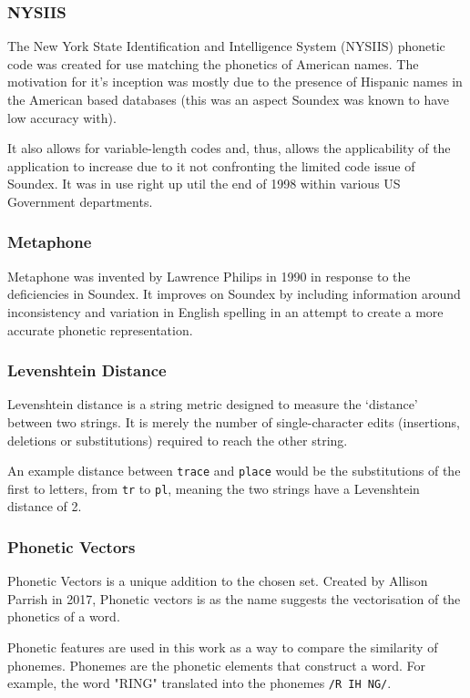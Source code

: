 \subsubsection*{NYSIIS}
\label{sec:nysiis}
The New York State Identification and Intelligence System (NYSIIS) phonetic code was created for use matching the phonetics of American names. The motivation for it's inception was mostly due to the presence of Hispanic names in the American based databases (this was an aspect Soundex was known to have low accuracy with). 

It also allows for variable-length codes and, thus, allows the applicability of the application to increase due to it not confronting the limited code issue of Soundex. It was in use right up util the end of 1998 within various US Government departments.

\subsubsection*{Metaphone}
\label{sec:metaphone}
Metaphone was invented by Lawrence Philips in 1990\cite{philips1990hanging} in response to the deficiencies in Soundex. It improves on Soundex by including information around inconsistency and variation in English spelling in an attempt to create a more accurate phonetic representation.

\subsubsection{Levenshtein Distance}
\label{sec:leven}
Levenshtein distance is a string metric designed to measure the `distance' between two strings. It is merely the number of single-character edits (insertions, deletions or substitutions) required to reach the other string.

An example distance between \verb|trace| and \verb|place| would be the substitutions of the first to letters, from \verb|tr| to \verb|pl|, meaning the two strings have a Levenshtein distance of 2.

\subsubsection{Phonetic Vectors}
\label{sec:phonetic_vectors}
Phonetic Vectors is a unique addition to the chosen set. Created by Allison Parrish in 2017\cite{parrish2017poetic}, Phonetic vectors is as the name suggests the vectorisation of the phonetics of a word.

Phonetic features are used in this work as a way to compare the similarity of phonemes. Phonemes are the phonetic elements that construct a word. For example, the word "RING" translated into the phonemes \verb|/R IH NG/|. 

